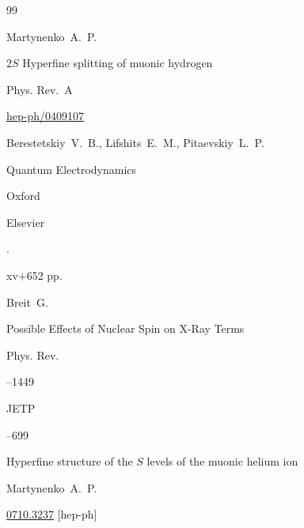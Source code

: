 \begin{thebibliography}{99}

\by Martynenko~A.~P.

\paper $2S$ Hyperfine splitting of muonic hydrogen

\jour Phys. Rev.~A






\arxiv \href{http://arxiv.org/abs/hep-ph/0409107}{hep-ph/0409107}




\by Berestetskiy~V.~B., Lifshits~E.~M., Pitaevskiy~L.~P.

\book Quantum Electrodynamics

\publaddr Oxford

\publ Elsevier

.


xv+652 pp.





\by Breit~G.

\paper Possible Effects of Nuclear Spin on X-Ray Terms

\jour Phys. Rev.




--1449





\jour JETP




--699

\paper Hyperfine structure of the $S$ levels of the muonic helium ion

\by Martynenko~A.~P.


\arxiv \href{http://arxiv.org/abs/0710.3237}{0710.3237} [hep-ph]




\end{thebibliography}
